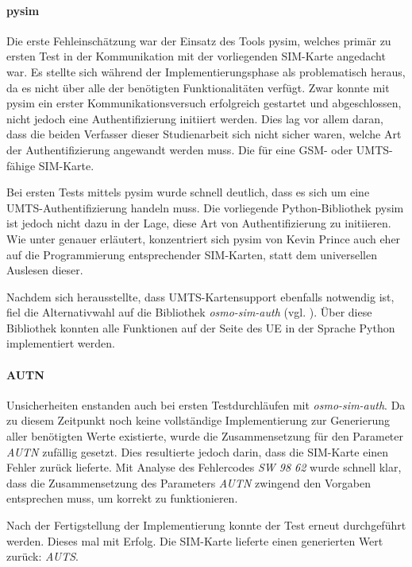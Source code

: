 		\paragraph{pysim}
		Die erste Fehleinschätzung war der Einsatz des Tools pysim, welches
		primär zu ersten Test in der Kommunikation mit der vorliegenden
		SIM-Karte angedacht war. Es stellte sich während der Implementierungsphase
		als problematisch heraus, da es nicht über alle der benötigten 
		Funktionalitäten verfügt. Zwar konnte mit pysim ein erster
		Kommunikationsversuch erfolgreich gestartet und abgeschlossen,
		nicht jedoch eine Authentifizierung initiiert werden. Dies lag
		vor allem daran, dass die beiden Verfasser dieser Studienarbeit sich nicht
		sicher waren, welche Art der Authentifizierung angewandt werden muss.
		Die für eine GSM- oder UMTS-fähige SIM-Karte.

		Bei ersten Tests mittels pysim wurde schnell deutlich, dass es
		sich um eine UMTS-Authentifizierung handeln muss. Die vorliegende
		Python-Bibliothek pysim ist jedoch nicht dazu in der Lage, diese
		Art von Authentifizierung zu initiieren. Wie unter 
		genauer erläutert, konzentriert sich pysim von Kevin Prince auch
		eher auf die Programmierung entsprechender SIM-Karten, statt
		dem universellen Auslesen dieser.

		Nachdem sich herausstellte, dass \ac{UMTS}-Kartensupport ebenfalls 
		notwendig ist, fiel die Alternativwahl
		auf die Bibliothek \textit{osmo-sim-auth}
		(vgl. ). Über diese Bibliothek konnten
		alle Funktionen auf der Seite des UE in der Sprache Python
		implementiert werden.

		\paragraph{AUTN} Unsicherheiten enstanden auch bei ersten Testdurchläufen
		mit \textit{osmo-sim-auth}. Da zu diesem Zeitpunkt noch keine 
		vollständige Implementierung zur Generierung aller benötigten
		Werte existierte, wurde die Zusammensetzung für den
		Parameter \textit{AUTN} zufällig gesetzt. Dies resultierte jedoch
		darin, dass die SIM-Karte einen Fehler zurück lieferte. Mit
		Analyse des Fehlercodes \textit{SW 98 62} wurde schnell klar,
		dass die Zusammensetzung des Parameters \textit{AUTN} zwingend
		den Vorgaben entsprechen muss, um korrekt zu funktionieren.

		Nach der Fertigstellung der Implementierung konnte der Test erneut
		durchgeführt werden. Dieses mal mit Erfolg. Die SIM-Karte lieferte
		einen generierten Wert zurück: \textit{AUTS}.

